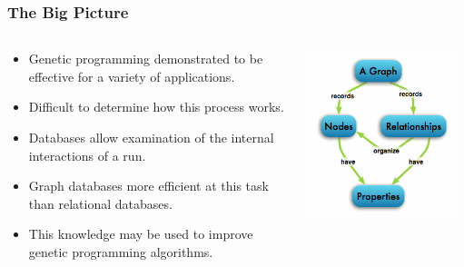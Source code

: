 \documentclass{beamer}
\begin{document}
\begin{frame}
  \frametitle{The Big Picture}
  
  \begin{columns}
  \begin{column}{0.55\textwidth}
  \begin{itemize}
	\item Genetic programming demonstrated to be effective for a variety of applications.
	\item Difficult to determine how this process works.
	\item Databases allow examination of the internal interactions of a run.
	\item Graph databases more efficient at this task than relational databases.
	\item This knowledge may be used to improve genetic programming algorithms.
  \end{itemize}
  \end{column}
  \begin{column}{0.45\textwidth}
   \includegraphics[width=0.95\textwidth]{graphdb-neo4j.png}
       \\
  \end{column}
  \end{columns}
\end{frame}
\end{document}

